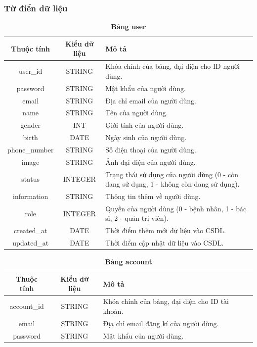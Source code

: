 \subsubsection{Từ điển dữ liệu}

\begin{table}[H]
  \caption{\bfseries \fontsize{12pt}{0pt}\selectfont Bảng user}
  \centering
  \begin{tabularx}{0.9\textwidth}{|c|c|X|}
    \hline
    \textbf{Thuộc tính} & \textbf{Kiểu dữ liệu} & \textbf{Mô tả} \\
    \hline
    user\_id & STRING & Khóa chính của bảng, đại diện cho ID người dùng. \\
    \hline
    password & STRING & Mật khẩu của người dùng. \\
    \hline
    email & STRING & Địa chỉ email của người dùng. \\
    \hline
    name & STRING & Tên của người dùng. \\
    \hline
    gender & INT & Giới tính của người dùng. \\
    \hline
    birth & DATE & Ngày sinh của người dùng. \\
    \hline
    phone\_number & STRING & Số điện thoại của người dùng. \\
    \hline
    image & STRING & Ảnh đại diện của người dùng. \\
    \hline
    status & INTEGER & Trạng thái sử dụng của người dùng (0 - còn đang sử dụng, 1 - không còn đang sử dụng). \\
    \hline
    information & STRING & Thông tin thêm về người dùng. \\
    \hline
    role & INTEGER & Quyền của người dùng (0 - bệnh nhân, 1 - bác sĩ, 2 - quản trị viên). \\
    \hline
    created\_at & DATE & Thời điểm thêm mới dữ liệu vào CSDL. \\
    \hline
    updated\_at & DATE & Thời điểm cập nhật dữ liệu vào CSDL. \\
    \hline
    
  \end{tabularx}
\end{table}


\begin{table}[H]
  \caption{\bfseries \fontsize{12pt}{0pt}\selectfont Bảng account}
  \centering
  \begin{tabularx}{0.9\textwidth}{|c|c|X|}
    \hline
    \textbf{Thuộc tính} & \textbf{Kiểu dữ liệu} & \textbf{Mô tả} \\
    \hline
    account\_id & STRING & Khóa chính của bảng, đại diện cho ID tài khoản. \\
    \hline
    email & STRING & Địa chỉ email đăng kí của người dùng. \\
    \hline
    password & STRING & Mật khẩu của người dùng. \\
    \hline
  \end{tabularx}
\end{table}

